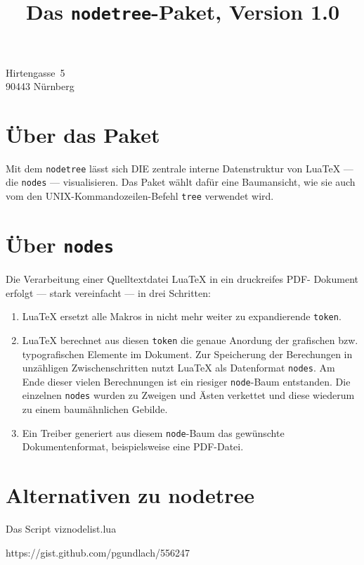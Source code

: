 \documentclass[ngerman]{dtk}
\let\Package\texttt
\begin{document}
\title{Das \texttt{nodetree}-Paket, Version 1.0}
    {Hirtengasse~5\\
     90443 Nürnberg\\
     }
\maketitle

\section{Über das Paket}

Mit dem \Package{nodetree} lässt sich DIE zentrale interne Datenstruktur
von Lua\TeX{} --- die \texttt{nodes} --- visualisieren. Das Paket wählt
dafür eine Baumansicht, wie sie auch vom den UNIX-Kommandozeilen-Befehl
\texttt{tree} verwendet wird.

\section{Über \texttt{nodes}}

Die Verarbeitung einer Quelltextdatei Lua\TeX{} in ein druckreifes PDF-%
Dokument erfolgt --- stark vereinfacht --- in drei Schritten:

\begin{enumerate}
\item Lua\TeX{} ersetzt alle Makros in nicht mehr weiter zu
expandierende \texttt{token}.

\item Lua\TeX{} berechnet aus diesen \texttt{token} die genaue Anordung
der grafischen bzw. typografischen Elemente im Dokument. Zur Speicherung
der Berechungen in unzähligen Zwischenschritten nutzt Lua\TeX{} als
Datenformat \texttt{nodes}. Am Ende dieser vielen Berechnungen ist ein
riesiger \texttt{node}-Baum entstanden. Die einzelnen \texttt{nodes}
wurden zu Zweigen und Ästen verkettet und diese wiederum zu einem
baumähnlichen Gebilde.

\item Ein Treiber generiert aus diesem \texttt{node}-Baum das gewünschte
Dokumentenformat, beispielsweise eine PDF-Datei.
\end{enumerate}

\section{Alternativen zu nodetree}

Das Script viznodelist.lua

https://gist.github.com/pgundlach/556247
\end{document}
